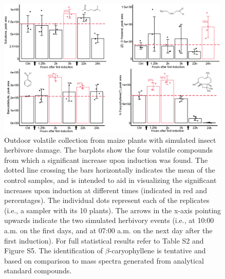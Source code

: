 \begin{figure}[!pht]
\centering
\includegraphics[width=0.99\textwidth]{chapters/papers/VOL/figures/fig-4-results/figure_4_outdoor.eps}
\caption{Outdoor volatile collection from maize plants with simulated insect herbivore damage. The barplots show the four volatile compounds from which a significant increase upon induction was found. The dotted line crossing the bars horizontally indicates the mean of the control samples, and is intended to aid in visualizing the significant increases upon induction at different times (indicated in red and percentages). The individual dots represent each of the replicates (i.e., a sampler with its 10 plants). The arrows in the x-axis pointing upwards indicate the two simulated herbivory events (i.e., at 10:00 a.m. on the first days, and at 07:00 a.m. on the next day after the first induction). For full statistical results refer to Table S2 and Figure S5. The identification of $\beta$-caryophyllene is tentative and based on comparison to mass spectra generated from analytical standard compounds.}
\label{fig:outdoor_testing}
\end{figure}

